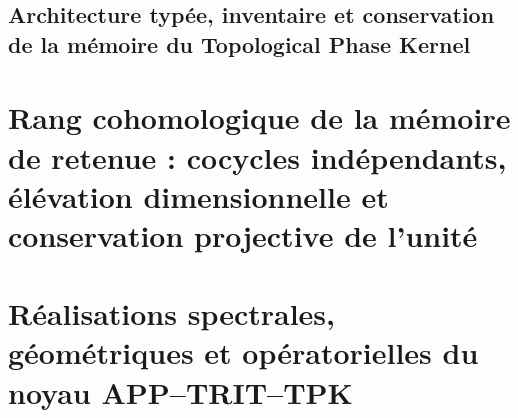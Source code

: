 \section{Architecture typée, inventaire et conservation de la mémoire du Topological Phase Kernel}
\label{sec:sucesor-102-propietarios-tpk}
\begin{HMTScientificOwnerSubordinated}


\end{HMTScientificOwnerSubordinated}
\begin{HMTScientificOwnerSubordinated}

\end{HMTScientificOwnerSubordinated}















\chapter{Rang cohomologique de la mémoire de retenue : cocycles indépendants, élévation dimensionnelle et conservation projective de l'unité}
\label{chap:sucesor-102-02}
\begin{HMTScientificOwnerSubordinated}

\end{HMTScientificOwnerSubordinated}

\chapter{Réalisations spectrales, géométriques et opératorielles du noyau APP–TRIT–TPK}
\label{chap:sucesor-102-03}

\label{owner:sucesor-102-03k-genealogia-operaciones}






